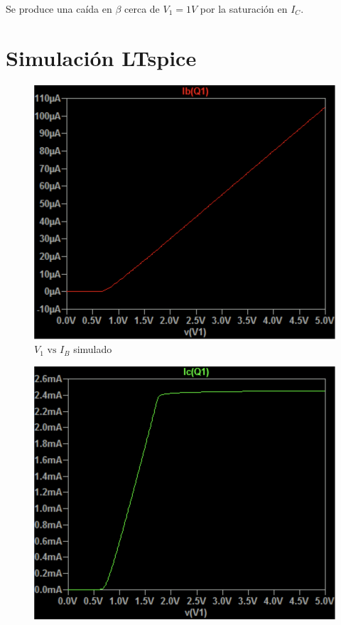 \documentclass[a4paper]{article}
\begin{document}
Se produce una caída en $\beta$ cerca de $V_1=1V$ por la saturación en $I_C$.

\newpage

\section{Simulación LTspice}

\begin{minipage}{\textwidth}
    \begin{minipage}{0.49\textwidth}
        \begin{figure}[H]
            \centering
            \includegraphics[width=\textwidth]{IMG/bjt_e_2.png}
            \caption{$V_1\text{ vs }I_B$ simulado}
            \label{fig:bjt_e_2}
        \end{figure}
    \end{minipage} \hfill
    \begin{minipage}{0.49\textwidth}
        \begin{figure}[H]
            \centering
            \includegraphics[width=\textwidth]{IMG/bjt_e_3.png}

\end{figure}
\end{minipage}
\end{minipage}
\end{document}
